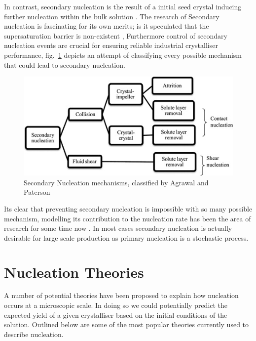 In contrast, secondary nucleation is the result of a initial 
seed crystal inducing further nucleation within the bulk solution
\cite{Botsaris1976}. The research of Secondary nucleation is 
fascinating for its own merits; is it speculated that the 
supersaturation barrier is non-existent \cite{Cashmore2022}, 
Furthermore control of secondary nucleation events are crucial 
for ensuring reliable industrial crystalliser performance, 
fig.~\ref{fig:secondary} depicts an attempt of classifying  
every possible mechanism that could lead to secondary nucleation.
\begin{figure}[h!]
	\centering
	\includegraphics[width=0.95\linewidth]{secondary_nucleation.jpg}
	\caption{Secondary Nucleation mechanisms, classified by Agrawal 
		and Paterson \cite{Agrawal2015}}
	\label{fig:secondary}
\end{figure}

Its clear that preventing secondary nucleation is impossible
with so many possible mechanism, modelling its contribution
to the nucleation rate has been the area of research for some
time now \cite{Cashmore2022, Flannigan2023}. In most cases 
secondary nucleation is actually desirable for large scale 
production as primary nucleation is a stochastic process.

\section{Nucleation Theories}
A number of potential theories have been proposed to explain 
how nucleation occurs at a microscopic scale. In doing so 
we could potentially predict the expected yield of a given
crystalliser based on the initial conditions of the 
solution. Outlined below are some of the most popular theories
currently used to describe nucleation. 

